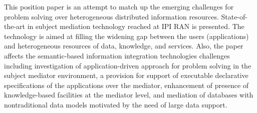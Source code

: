 
\titele{\tit}{\aut}{\auf}{\leftkol}{\rightkol}


\def\leftkol{ENGLISH ABSTRACTS}

\def\rightkol{ENGLISH ABSTRACTS}

\noindent
This position paper is an attempt to match up the emerging 
challenges for problem solving over heterogeneous distributed 
information resources. State-of-the-art in subject mediation 
technology reached at IPI RAN is presented. The technology 
is aimed at filling the widening gap between the users 
(applications) and heterogeneous resources of data, knowledge, 
and services. Also, the paper affects the semantic-based information 
integration technologies challenges including investigation of 
application-driven approach for problem solving in the subject 
mediator environment, a provision for support of executable 
declarative specifications of the applications over the mediator, 
enhancement of presence of knowledge-based facilities at the mediator level, 
and mediation of databases with nontraditional data models motivated by the need 
of large data support.



 


\def\tit{THE MOTIF INFORMATION ANALYSIS BASED ON~THE~SOLVABILITY CRITERION 
FOR~THE~PROTEIN SECONDARY STRUCTURE RECOGNITION}

\def\aut{K.\,V.~Rudakov and I.\,Yu.~Torshin$^2$}

\def\auf{$^1$Dorodnicyn Computing Center of the Russian Academy of Sciences;
Moscow Institute of Physics and Technology\\
$\hphantom{^1}$(State University), rudakov@ccas.ru\\[1pt]
$^2$Russian Center of the Trace Element Institute for UNESCO, tiy135@yahoo.com}


\def\leftkol{ENGLISH ABSTRACTS}

\def\rightkol{ENGLISH ABSTRACTS}

